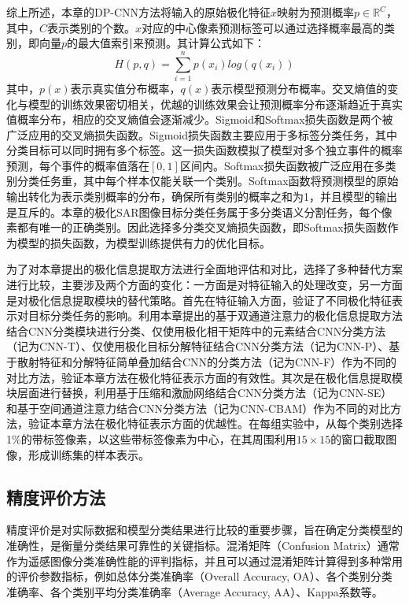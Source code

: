 综上所述，本章的DP-CNN方法将输入的原始极化特征$x$映射为预测概率$p\in \mathbb{R}^{C}$，其中，$C$表示类别的个数。$x$对应的中心像素预测标签可以通过选择概率最高的类别，即向量$p$的最大值索引来预测。其计算公式如下：
\begin{equation}
    H(p,q)=\sum_{i=1}^{n}p(x_i)log(q(x_i))
\end{equation}
其中，$p(x)$表示真实值分布概率，$q(x)$表示模型预测分布概率。交叉熵值的变化与模型的训练效果密切相关，优越的训练效果会让预测概率分布逐渐趋近于真实值概率分布，相应的交叉熵值会逐渐减少。Sigmoid和Softmax损失函数是两个被广泛应用的交叉熵损失函数。Sigmoid损失函数主要应用于多标签分类任务，其中分类目标可以同时拥有多个标签。这一损失函数模拟了模型对多个独立事件的概率预测，每个事件的概率值落在$[0,1]$区间内。Softmax损失函数被广泛应用在多类别分类任务重，其中每个样本仅能关联一个类别。Softmax函数将预测模型的原始输出转化为表示类别概率的分布，确保所有类别的概率之和为1，并且模型的输出是互斥的。本章的极化SAR图像目标分类任务属于多分类语义分割任务，每个像素都有唯一的正确类别。因此选择多分类交叉熵损失函数，即Softmax损失函数作为模型的损失函数，为模型训练提供有力的优化目标。

为了对本章提出的极化信息提取方法进行全面地评估和对比，选择了多种替代方案进行比较，主要涉及两个方面的变化：一方面是对特征输入的处理改变，另一方面是对极化信息提取模块的替代策略。首先在特征输入方面，验证了不同极化特征表示对目标分类任务的影响。利用本章提出的基于双通道注意力的极化信息提取方法结合CNN分类模块进行分类、仅使用极化相干矩阵中的元素结合CNN分类方法（记为CNN-T）、仅使用极化目标分解特征结合CNN分类方法（记为CNN-P）、基于散射特征和分解特征简单叠加结合CNN的分类方法（记为CNN-F）作为不同的对比方法，验证本章方法在极化特征表示方面的有效性。其次是在极化信息提取模块层面进行替换，利用基于压缩和激励网络结合CNN分类方法（记为CNN-SE）和基于空间通道注意力结合CNN分类方法（记为CNN-CBAM）作为不同的对比方法，验证本章方法在极化特征表示方面的优越性。在每组实验中，从每个类别选择1\%的带标签像素，以这些带标签像素为中心，在其周围利用$15 \times 15$的窗口截取图像，形成训练集的样本表示。

\subsection{精度评价方法}
精度评价是对实际数据和模型分类结果进行比较的重要步骤，旨在确定分类模型的准确性，是衡量分类结果可靠性的关键指标。混淆矩阵（Confusion Matrix）通常作为遥感图像分类准确性能的评判指标，并且可以通过混淆矩阵计算得到多种常用的评价参数指标，例如总体分类准确率（Overall Accuracy, OA）、各个类别分类准确率、各个类别平均分类准确率（Average Accuracy, AA）、Kappa系数等。

